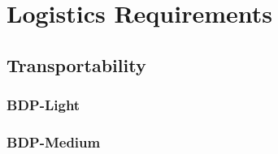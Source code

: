\KNEADSECTIONNEWPAGE
\section{Logistics Requirements}
\label{lab:sec_Logistics}




%


\KNEADSUBSECTIONNEWPAGE
\subsection{Transportability}
\label{lab:ssec_Logistics_Transportability}





\KNEADSUBSUBSECTIONNEWPAGE
\subsubsection{BDP-Light}
\label{lab:sssec_Logistics_Transit_Cases_Light}





\subsubsection{BDP-Medium}
\label{lab:sssec_Logistics_Transit_Cases_Medium}



